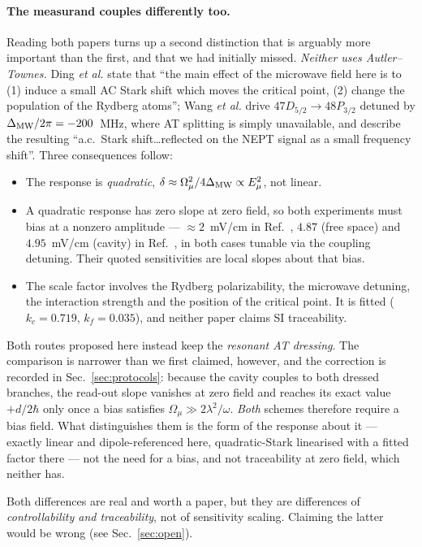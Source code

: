 \documentclass[11pt,a4paper]{article}
\newcommand{\Om}{\Omega}
\newcommand{\Omu}{\Omega_{\mu}}
\begin{document}
\paragraph{The measurand couples differently too.} Reading both papers turns up a second
distinction that is arguably more important than the first, and that we had initially
missed. \emph{Neither uses Autler--Townes.} Ding \emph{et al.} state that ``the main effect
of the microwave field here is to (1) induce a small AC Stark shift which moves the critical
point, (2) change the population of the Rydberg atoms''; Wang \emph{et al.} drive
$47D_{5/2}\!\to\!48P_{3/2}$ detuned by $\Delta_{\rm MW}/2\pi=-200$~MHz, where AT splitting is
simply unavailable, and describe the resulting ``a.c.\ Stark shift\ldots reflected on the
NEPT signal as a small frequency shift''. Three consequences follow:
\begin{itemize}
  \item The response is \emph{quadratic}, $\delta\approx\Om_\mu^2/4\Delta_{\rm MW}\propto
        E_\mu^2$, not linear.
  \item A quadratic response has zero slope at zero field, so both experiments must bias at a
        nonzero amplitude --- $\approx2$~mV/cm in Ref.~\cite{Ding2022}, $4.87$ (free space)
        and $4.95$~mV/cm (cavity) in Ref.~\cite{Wang2025}, in both cases tunable via the
        coupling detuning. Their quoted sensitivities are local slopes about that bias.
  \item The scale factor involves the Rydberg polarizability, the microwave detuning, the
        interaction strength and the position of the critical point. It is fitted
        ($k_c=0.719$, $k_f=0.035$), and neither paper claims SI traceability.
\end{itemize}
Both routes proposed here instead keep the \emph{resonant AT dressing}. The comparison is
narrower than we first claimed, however, and the correction is recorded in
Sec.~\ref{sec:protocols}: because the cavity couples to both dressed branches, the read-out
slope vanishes at zero field and reaches its exact value $+d/2\hbar$ only once a bias
satisfies $\Omu\gg2\lambda^2/\omega$. \emph{Both} schemes therefore require a bias field.
What distinguishes them is the form of the response about it --- exactly linear and
dipole-referenced here, quadratic-Stark linearised with a fitted factor there --- not the
need for a bias, and not traceability at zero field, which neither has.

\medskip
Both differences are real and worth a paper, but they are differences of
\emph{controllability and traceability}, not of sensitivity scaling. Claiming the latter
would be wrong (see Sec.~\ref{sec:open}).
\end{document}

